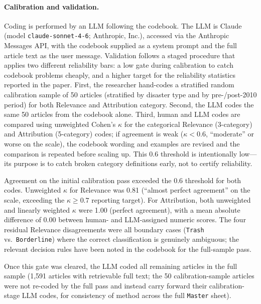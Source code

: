 \documentclass[12pt]{article}
\begin{document}
\paragraph{Calibration and validation.} Coding is performed by an
LLM following the codebook. The LLM is Claude (model
\texttt{claude-sonnet-4-6}; Anthropic, Inc.), accessed via the
Anthropic Messages API, with the codebook supplied as a system prompt
and the full article text as the user message. Validation follows a
staged procedure that applies two different reliability bars: a low
gate during calibration to catch codebook problems cheaply, and a
higher target for the reliability statistics reported in the paper.
First, the researcher hand-codes a stratified random calibration
sample of 50 articles (stratified by disaster type and by
pre-/post-2010 period) for both Relevance and Attribution category.
Second, the LLM codes the same 50 articles from the codebook alone.
Third, human and LLM codes are compared using unweighted Cohen's
$\kappa$ for the categorical Relevance (3-category) and Attribution
(5-category) codes; if agreement is weak ($\kappa < 0.6$,
``moderate'' or worse on the \citet{landiskoch1977} scale), the
codebook wording and examples are revised and the comparison is
repeated before scaling up. This 0.6 threshold is intentionally
low---its purpose is to catch broken category definitions early, not
to certify reliability.

Agreement on the initial calibration pass exceeded the 0.6 threshold for both codes. Unweighted
$\kappa$ for Relevance was 0.81 (``almost perfect agreement'' on the
\citealt{landiskoch1977} scale, exceeding the $\kappa \geq 0.7$
reporting target). For Attribution, both unweighted and linearly
weighted $\kappa$ were 1.00 (perfect agreement), with a mean absolute
difference of 0.00 between human- and LLM-assigned numeric scores.
The four residual Relevance disagreements were all boundary cases
(\texttt{Trash} vs.\ \texttt{Borderline}) where the correct
classification is genuinely ambiguous; the relevant decision rules
have been noted in the codebook for the full-sample pass.

Once this gate was cleared, the LLM coded all remaining articles in
the full sample (1,591 articles with retrievable full text; the 50
calibration-sample articles were not re-coded by the full pass and
instead carry forward their calibration-stage LLM codes, for
consistency of method across the full \texttt{Master} sheet).
\end{document}
